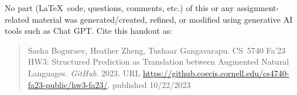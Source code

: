 
\vspace{1.5em}

No part (\LaTeX~code, questions, comments, etc.) of this or any assignment-
related material was generated/created, refined, or modified using generative 
AI tools such as Chat GPT. Cite this handout as:
\begin{quote}
    Sasha Boguraev, Heather Zheng, Tushaar Gangavarapu. CS~5740 Fa'23 HW3: Structured Prediction as Translation between Augmented Natural Languages. \textit{GitHub}. 2023. URL 
    \url{https://github.coecis.cornell.edu/cs4740-fa23-public/hw3-fa23/}. 
    published 10/22/2023
\end{quote}

